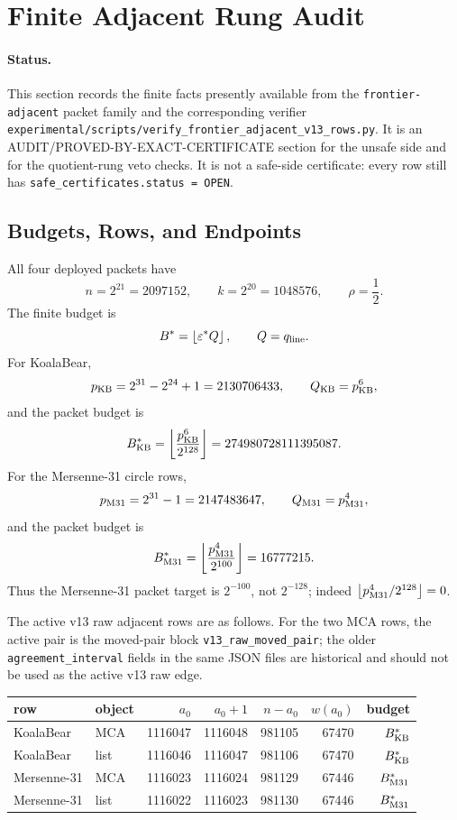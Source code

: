 \section{Finite Adjacent Rung Audit}
\label{sec:finite-next}

\paragraph{Status.}
This section records the finite facts presently available from the
\texttt{frontier-adjacent} packet family and the corresponding verifier
\texttt{experimental/scripts/verify\_frontier\_adjacent\_v13\_rows.py}.
It is an \textup{AUDIT}/\textup{PROVED-BY-EXACT-CERTIFICATE} section for the
unsafe side and for the quotient-rung veto checks.  It is not a safe-side
certificate: every row still has \texttt{safe\_certificates.status = OPEN}.

\subsection{Budgets, Rows, and Endpoints}

All four deployed packets have
\[
        n=2^{21}=2097152,\qquad k=2^{20}=1048576,\qquad \rho=\frac12.
\]
The finite budget is
\[
        B^*=\left\lfloor \varepsilon^* Q\right\rfloor,\qquad Q=q_{\rm line}.
\]
For KoalaBear,
\[
        p_{\rm KB}=2^{31}-2^{24}+1=2130706433,\qquad Q_{\rm KB}=p_{\rm KB}^6,
\]
and the packet budget is
\[
        B^*_{\rm KB}=
        \left\lfloor\frac{p_{\rm KB}^6}{2^{128}}\right\rfloor
        =274980728111395087.
\]
For the Mersenne-31 circle rows,
\[
        p_{\rm M31}=2^{31}-1=2147483647,\qquad Q_{\rm M31}=p_{\rm M31}^4,
\]
and the packet budget is
\[
        B^*_{\rm M31}=
        \left\lfloor\frac{p_{\rm M31}^4}{2^{100}}\right\rfloor
        =16777215.
\]
Thus the Mersenne-31 packet target is \(2^{-100}\), not \(2^{-128}\);
indeed \(\left\lfloor p_{\rm M31}^4/2^{128}\right\rfloor=0\).

The active v13 raw adjacent rows are as follows.  For the two MCA rows, the
active pair is the moved-pair block \texttt{v13\_raw\_moved\_pair}; the
older \texttt{agreement\_interval} fields in the same JSON files are historical
and should not be used as the active v13 raw edge.

\begin{center}\footnotesize
\begin{tabular}{@{}llrrrrr@{}}
\toprule
row & object & \(a_0\) & \(a_0+1\) & \(n-a_0\) & \(w(a_0)\) & budget\\
\midrule
KoalaBear & MCA  & 1116047 & 1116048 & 981105 & 67470 & \(B^*_{\rm KB}\)\\
KoalaBear & list & 1116046 & 1116047 & 981106 & 67470 & \(B^*_{\rm KB}\)\\
Mersenne-31 & MCA  & 1116023 & 1116024 & 981129 & 67446 & \(B^*_{\rm M31}\)\\
Mersenne-31 & list & 1116022 & 1116023 & 981130 & 67446 & \(B^*_{\rm M31}\)\\
\bottomrule
\end{tabular}
\end{center}

